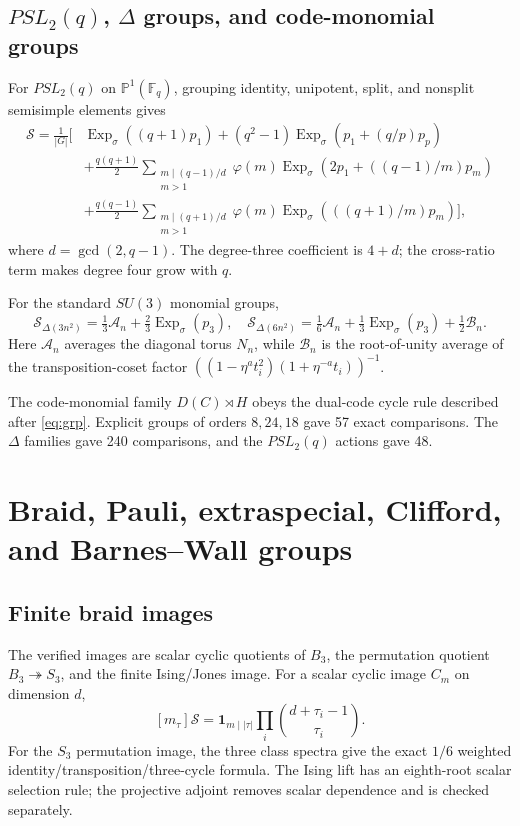 \documentclass[10pt]{article}
\newcommand{\ExpS}{\operatorname{Exp}_{\sigma}}
\newcommand{\MGF}{\mathcal S}
\newcommand{\F}{\mathbb F}
\begin{document}
\subsection{$PSL_2(q)$, $\Delta$ groups, and code-monomial groups}
For $PSL_2(q)$ on $\mathbb P^1(\F_q)$, grouping identity, unipotent, split,
and nonsplit semisimple elements gives
\begin{align*}
\MGF=\frac1{|G|}\Big[&\ExpS((q+1)p_1)+(q^2-1)\ExpS(p_1+(q/p)p_p)\\
&+\frac{q(q+1)}2\sum_{\substack{m\mid(q-1)/d\\m>1}}\!\varphi(m)
\ExpS(2p_1+((q-1)/m)p_m)\\
&+\frac{q(q-1)}2\sum_{\substack{m\mid(q+1)/d\\m>1}}\!\varphi(m)
\ExpS(((q+1)/m)p_m)\Big],
\end{align*}
where $d=\gcd(2,q-1)$. The degree-three coefficient is $4+d$; the
cross-ratio term makes degree four grow with $q$.

For the standard $SU(3)$ monomial groups,
\begin{equation}\label{eq:delta}
\boxed{\MGF_{\Delta(3n^2)}=\tfrac13\mathcal A_n+\tfrac23\ExpS(p_3),
\quad
\MGF_{\Delta(6n^2)}=\tfrac16\mathcal A_n+\tfrac13\ExpS(p_3)+\tfrac12\mathcal B_n.}
\end{equation}
Here $\mathcal A_n$ averages the diagonal torus $N_n$, while $\mathcal B_n$
is the root-of-unity average of the transposition-coset factor
$((1-\eta^at_i^2)(1+\eta^{-a}t_i))^{-1}$.

The code-monomial family $D(C)\rtimes H$ obeys the dual-code cycle rule
described after \eqref{eq:grp}. Explicit groups of orders $8,24,18$ gave 57
exact comparisons. The $\Delta$ families gave 240 comparisons, and the
$PSL_2(q)$ actions gave 48.

\section{Braid, Pauli, extraspecial, Clifford, and Barnes--Wall groups}

\subsection{Finite braid images}
The verified images are scalar cyclic quotients of $B_3$, the permutation
quotient $B_3\twoheadrightarrow S_3$, and the finite Ising/Jones image. For a
scalar cyclic image $C_m$ on dimension $d$,
\[
[m_\tau]\MGF=\mathbf1_{m\mid|\tau|}\prod_i\binom{d+\tau_i-1}{\tau_i}.
\]
For the $S_3$ permutation image, the three class spectra give the exact
$1/6$ weighted identity/transposition/three-cycle formula. The Ising lift has
an eighth-root scalar selection rule; the projective adjoint removes scalar
dependence and is checked separately.
\end{document}
